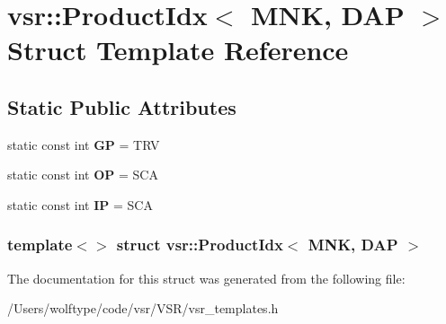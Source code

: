 \hypertarget{structvsr_1_1_product_idx_3_01_m_n_k_00_01_d_a_p_01_4}{\section{vsr\-:\-:Product\-Idx$<$ M\-N\-K, D\-A\-P $>$ Struct Template Reference}
\label{structvsr_1_1_product_idx_3_01_m_n_k_00_01_d_a_p_01_4}
}
\subsection*{Static Public Attributes}
\begin{DoxyCompactItemize}
\item 
\hypertarget{structvsr_1_1_product_idx_3_01_m_n_k_00_01_d_a_p_01_4_ad2e3af3ab88dd726cc76e82b40f633ed}{static const int {\bfseries G\-P} = T\-R\-V}\label{structvsr_1_1_product_idx_3_01_m_n_k_00_01_d_a_p_01_4_ad2e3af3ab88dd726cc76e82b40f633ed}

\item 
\hypertarget{structvsr_1_1_product_idx_3_01_m_n_k_00_01_d_a_p_01_4_aa00370033829dccda6cfbb1eb6ead8f2}{static const int {\bfseries O\-P} = S\-C\-A}\label{structvsr_1_1_product_idx_3_01_m_n_k_00_01_d_a_p_01_4_aa00370033829dccda6cfbb1eb6ead8f2}

\item 
\hypertarget{structvsr_1_1_product_idx_3_01_m_n_k_00_01_d_a_p_01_4_a3de9dcf2e97a3f399fb89278d87e7a2e}{static const int {\bfseries I\-P} = S\-C\-A}\label{structvsr_1_1_product_idx_3_01_m_n_k_00_01_d_a_p_01_4_a3de9dcf2e97a3f399fb89278d87e7a2e}

\end{DoxyCompactItemize}
\subsubsection*{template$<$$>$ struct vsr\-::\-Product\-Idx$<$ M\-N\-K, D\-A\-P $>$}



The documentation for this struct was generated from the following file\-:\begin{DoxyCompactItemize}
\item 
/\-Users/wolftype/code/vsr/\-V\-S\-R/vsr\-\_\-templates.\-h\end{DoxyCompactItemize}
